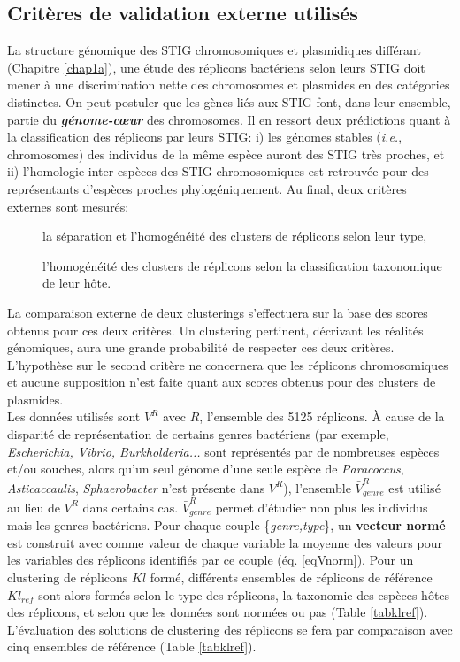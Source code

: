 \subsection{Critères de validation externe utilisés}		    
   La structure génomique des STIG chromosomiques et plasmidiques différant (Chapitre \ref{chap1a}), une étude des réplicons bactériens selon leurs STIG doit mener à une discrimination nette des chromosomes et plasmides en des catégories distinctes. On peut postuler que les gènes liés aux STIG font, dans leur ensemble, partie du \textbf{\textit{génome-cœur}} des chromosomes. Il en ressort deux prédictions quant à la classification des réplicons par leurs STIG: i) les génomes stables (\textit{i.e.}, chromosomes) des individus de la même espèce auront des STIG très proches, et ii) l'homologie inter-espèces des STIG chromosomiques est retrouvée pour des représentants d'espèces proches phylogéniquement. Au final, deux critères externes sont mesurés:
    \begin{description}
    \item[\textbullet] la séparation et l'homogénéité des clusters de réplicons selon leur type,
    \item[\textbullet] l'homogénéité des clusters de réplicons selon la classification taxonomique de leur hôte.
    \end{description}
La comparaison externe de deux clusterings s'effectuera sur la base des scores obtenus pour ces deux critères. Un clustering pertinent, décrivant les réalités génomiques, aura une grande probabilité de respecter ces deux critères. L'hypothèse sur le second critère ne concernera que les réplicons chromosomiques et aucune supposition n'est faite quant aux scores obtenus pour des clusters de plasmides.  
 \\
 Les données utilisés sont $V^{R}$ avec $R$, l'ensemble des 5125 réplicons. À cause de la disparité de représentation de certains genres bactériens (par exemple, \textit{Escherichia, Vibrio, Burkholderia...} sont représentés par de nombreuses espèces et/ou souches, alors qu'un seul génome d'une seule espèce de \textit{Paracoccus}, \textit{Asticaccaulis}, \textit{Sphaerobacter} n'est présente dans $V^{R}$), l'ensemble $\bar{V}^{R}_{genre}$ est utilisé au lieu de $V^{R}$ dans certains cas. $\bar{V}^{R}_{genre}$ permet d'étudier non plus les individus mais les genres bactériens. Pour chaque couple \{\textit{genre,type}\}, un \textbf{vecteur normé} est construit avec comme valeur de chaque variable la moyenne des valeurs pour les variables des réplicons identifiés par ce couple (éq. \ref{eqVnorm}). Pour un clustering de réplicons $Kl$ formé, différents ensembles de réplicons de référence  $Kl_{ref}$ sont alors formés selon le type des réplicons, la taxonomie des espèces hôtes des réplicons, et selon que les données sont normées ou pas (Table \ref{tabklref}). L'évaluation des solutions de clustering des réplicons se fera par comparaison avec cinq ensembles de référence (Table \ref{tabklref}). 

